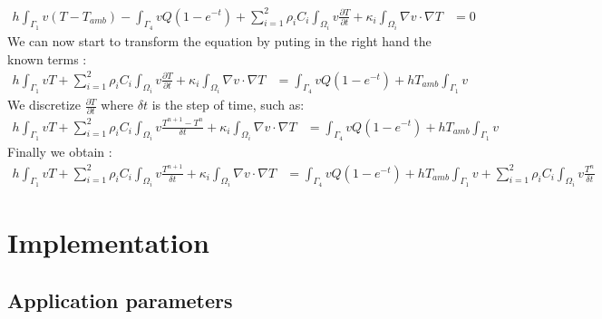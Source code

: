 \begin{equation}
   \begin{split}
 \displaystyle{ h \int_{\Gamma_1}{v(T-T_{amb})} - \int_{\Gamma_4} {vQ(1-e^{-t})}  + \sum_{i=1}^{2} \rho_i C_i \int_{\varOmega_i} v\frac{ \partial T}{\partial t} + \kappa_i \int_{\varOmega_i} {\nabla v \cdot \nabla T} } & =   0 
  \end{split}
\end{equation}
We can now start to transform the equation by puting in the right hand the known terms :
\begin{equation}
   \begin{split}
 \displaystyle{ h \int_{\Gamma_1}{v T}  + \sum_{i=1}^{2} \rho_i C_i \int_{\varOmega_i} v\frac{ \partial T}{\partial t} + \kappa_i \int_{\varOmega_i} {\nabla v \cdot \nabla T} } & =  
 \int_{\Gamma_4} {vQ(1-e^{-t})}	 +  hT_{amb}\int_{\Gamma_1}{v}
  \end{split}
\end{equation}
We discretize $\displaystyle{\frac{\partial T}{\partial t}}$ where $\delta t$ is the step of time, such as:
\begin{equation}
   \begin{split}
 \displaystyle{ h \int_{\Gamma_1}{v T} + \sum_{i=1}^{2} \rho_i C_i \int_{\varOmega_i} v\frac{T^{n+1} - T^n}{\delta t} + \kappa_i \int_{\varOmega_i} {\nabla v \cdot \nabla T} } & =  
 \int_{\Gamma_4} {vQ(1-e^{-t})}	 +  hT_{amb}\int_{\Gamma_1}{v}
  \end{split}
\end{equation}
Finally we obtain :
\begin{equation}
   \begin{split}
 \displaystyle{ h \int_{\Gamma_1}{v T} + \sum_{i=1}^{2} \rho_i C_i \int_{\varOmega_i} v\frac{T^{n+1}}{\delta t} + \kappa_i \int_{\varOmega_i} {\nabla v \cdot \nabla T}} & =  
	\displaystyle{ \int_{\Gamma_4} {vQ(1-e^{-t})} +  hT_{amb}\int_{\Gamma_1}{v}	+  \sum_{i=1}^{2}  \rho_i C_i \int_{\varOmega_i} v \frac{T^n}{\delta t}  }
  \end{split}
\end{equation}

\section{Implementation}
\label{heat:impl}

\subsection{Application parameters}
\label{heat:param}

